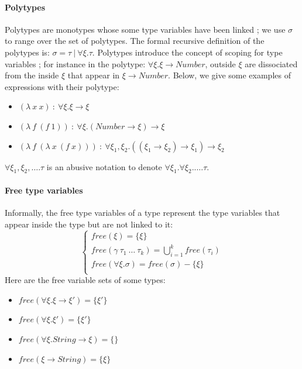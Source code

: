 \documentclass[a4paper]{report}
\begin{document}
\paragraph{Polytypes} Polytypes are monotypes whose some type variables have been linked ; we use $\sigma$ to range over the set of polytypes. The formal recursive definition of the polytypes is: $\sigma=\tau\ |\ \forall\xi.\tau$. Polytypes introduce the concept of scoping for type variables ; for instance in the polytype: $\forall \xi.\xi\to Number$, outside $\xi$ are dissociated from the inside $\xi$ that appear in $\xi\to Number$. Below, we give some examples of expressions with their polytype:
\begin{itemize}
\item $(\lambda\ x\ x)\ :\ \forall\xi.\xi\to\xi$
\item $(\lambda\ f\ (f\ 1))\ :\ \forall\xi.(Number\to\xi)\to\xi$
\item $(\lambda\ f\ (\lambda\ x\ (f\ x)))\ :\ \forall\xi_1,\xi_2.((\xi_1\to\xi_2)\to\xi_1)\to\xi_2$
\end{itemize}
$\forall\xi_1,\xi_2,\ldots.\tau$ is an abusive notation to denote $\forall\xi_1.\forall\xi_2.\ldots.\tau$.

\paragraph{Free type variables} Informally, the free type variables of a type represent the type variables that appear inside the type but are not linked to it:
$$\left\{\begin{array}{l}
free(\xi)=\{\xi\}\\
free(\gamma\ \tau_1\ \ldots\ \tau_k)=\bigcup_{i=1}^k{free(\tau_i)}\\
free(\forall\xi.\sigma)=free(\sigma)-\{\xi\}\\
\end{array}\right.$$
Here are the free variable sets of some types:
\begin{itemize}
\item $free(\forall\xi.\xi\to\xi')=\{\xi'\}$
\item $free(\forall\xi.\xi')=\{\xi'\}$
\item $free(\forall\xi.String\to\xi)=\{\}$
\item $free(\xi\to String)=\{\xi\}$
\end{itemize}
\end{document}
